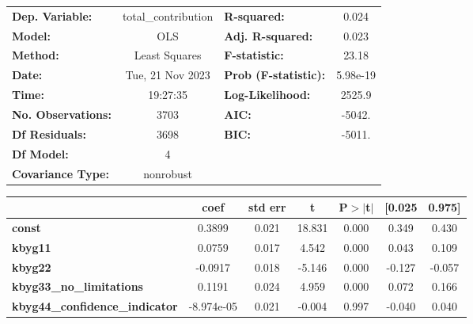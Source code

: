 \begin{center}
\begin{tabular}{lclc}
\toprule
\textbf{Dep. Variable:}                & total\_contribution & \textbf{  R-squared:         } &     0.024   \\
\textbf{Model:}                        &         OLS         & \textbf{  Adj. R-squared:    } &     0.023   \\
\textbf{Method:}                       &    Least Squares    & \textbf{  F-statistic:       } &     23.18   \\
\textbf{Date:}                         &   Tue, 21 Nov 2023  & \textbf{  Prob (F-statistic):} &  5.98e-19   \\
\textbf{Time:}                         &       19:27:35      & \textbf{  Log-Likelihood:    } &    2525.9   \\
\textbf{No. Observations:}             &          3703       & \textbf{  AIC:               } &    -5042.   \\
\textbf{Df Residuals:}                 &          3698       & \textbf{  BIC:               } &    -5011.   \\
\textbf{Df Model:}                     &             4       & \textbf{                     } &             \\
\textbf{Covariance Type:}              &      nonrobust      & \textbf{                     } &             \\
\bottomrule
\end{tabular}
\begin{tabular}{lcccccc}
                                       & \textbf{coef} & \textbf{std err} & \textbf{t} & \textbf{P$> |$t$|$} & \textbf{[0.025} & \textbf{0.975]}  \\
\midrule
\textbf{const}                         &       0.3899  &        0.021     &    18.831  &         0.000        &        0.349    &        0.430     \\
\textbf{kbyg11}                        &       0.0759  &        0.017     &     4.542  &         0.000        &        0.043    &        0.109     \\
\textbf{kbyg22}                        &      -0.0917  &        0.018     &    -5.146  &         0.000        &       -0.127    &       -0.057     \\
\textbf{kbyg33\_no\_limitations}       &       0.1191  &        0.024     &     4.959  &         0.000        &        0.072    &        0.166     \\
\textbf{kbyg44\_confidence\_indicator} &   -8.974e-05  &        0.021     &    -0.004  &         0.997        &       -0.040    &        0.040     \\

\end{tabular}
\end{center}
